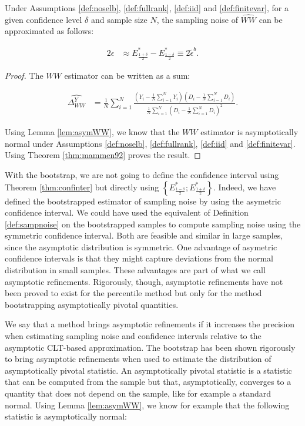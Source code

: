 \documentclass[]{book}
\theoremstyle{definition}
\theoremstyle{definition}
\theoremstyle{definition}
\theoremstyle{remark}
\let\BeginKnitrBlock\begin \let\EndKnitrBlock\end
\begin{document}
\BeginKnitrBlock{theorem}[Bootstrapped Estimate of Sampling Noise of WW]
\protect\hypertarget{thm:bootnoiseWW}{}{\label{thm:bootnoiseWW}
\iffalse (Bootstrapped Estimate of Sampling Noise of WW) \fi{} }Under
Assumptions \ref{def:noselb}, \ref{def:fullrank}, \ref{def:iid} and
\ref{def:finitevar}, for a given confidence level \(\delta\) and sample
size \(N\), the sampling noise of \(\hat{WW}\) can be approximated as
follows:

\begin{align*}
2\epsilon & \approx E^*_{\frac{1+\delta}{2}}-E^*_{\frac{1-\delta}{2}} \equiv 2\tilde{\epsilon}^b.
\end{align*}
\EndKnitrBlock{theorem}

\BeginKnitrBlock{proof}
\iffalse{} {Proof. } \fi{}The \(WW\) estimator can be written as a sum:

\begin{align*}
\hat{\Delta^Y_{WW}} & = \frac{1}{N}\sum_{i=1}^N\frac{\left(Y_i-\frac{1}{N}\sum_{i=1}^NY_i\right)\left(D_i-\frac{1}{N}\sum_{i=1}^ND_i\right)}{\frac{1}{N}\sum_{i=1}^N\left(D_i-\frac{1}{N}\sum_{i=1}^ND_i\right)^2}.
\end{align*}

Using Lemma \ref{lem:asymWW}, we know that the \(WW\) estimator is
asymptotically normal under Assumptions \ref{def:noselb},
\ref{def:fullrank}, \ref{def:iid} and \ref{def:finitevar}. Using Theorem
\ref{thm:mammen92} proves the result.
\EndKnitrBlock{proof}

\BeginKnitrBlock{remark}
\iffalse{} {Remark. } \fi{}With the bootstrap, we are not going to
define the confidence interval using Theorem \ref{thm:confinter} but
directly using
\(\left\{E^*_{\frac{1-\delta}{2}};E^*_{\frac{1+\delta}{2}}\right\}\).
Indeed, we have defined the bootstrapped estimator of sampling noise by
using the asymetric confidence interval. We could have used the
equivalent of Definition \ref{def:sampnoise} on the bootstrapped samples
to compute sampling noise using the symmetric confidence interval. Both
are feasible and similar in large samples, since the asymptotic
distribution is symmetric. One advantage of asymetric confidence
intervals is that they might capture deviations from the normal
distribution in small samples. These advantages are part of what we call
asymptotic refinements. Rigorously, though, asymptotic refinements have
not been proved to exist for the percentile method but only for the
method bootstrapping asymptotically pivotal quantities.
\EndKnitrBlock{remark}

\BeginKnitrBlock{remark}
\iffalse{} {Remark. } \fi{}We say that a method brings asymptotic
refinements if it increases the precision when estimating sampling noise
and confidence intervals relative to the asymptotic CLT-based
approximation. The bootstrap has been shown rigorously to bring
asymptotic refinements when used to estimate the distribution of
asymptotically pivotal statistic. An asymptotically pivotal statistic is
a statistic that can be computed from the sample but that,
asymptotically, converges to a quantity that does not depend on the
sample, like for example a standard normal. Using Lemma
\ref{lem:asymWW}, we know for example that the following statistic is
asymptotically normal:
\EndKnitrBlock{remark}
\end{document}
